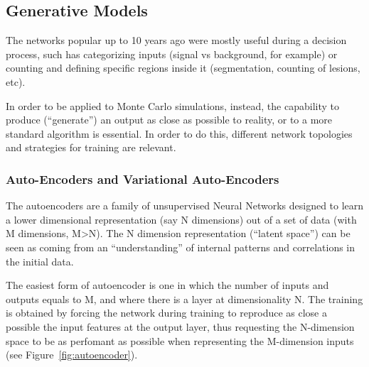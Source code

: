 \subsection{Generative Models}
\label{subseq:gan}
The networks popular up to 10 years ago were mostly useful during a decision process, such has categorizing inputs (signal vs background, for example) or counting and defining specific regions inside it (segmentation, counting of lesions, etc).

In order to be applied to Monte Carlo simulations, instead, the capability to produce (``generate'') an output as close as possible to reality, or to a more standard algorithm is essential. In order to do this, different network topologies and strategies for training are relevant.


\subsubsection{Auto-Encoders and Variational Auto-Encoders}
\label{sec:unsupervised}
The autoencoders are a family of unsupervised Neural Networks designed to learn a lower dimensional representation (say N dimensions) out of a set of data (with M dimensions, M\textgreater N). The N dimension representation (``latent space'') can be seen as coming from an ``understanding'' of internal patterns and correlations in the initial data.

The easiest form of autoencoder is one in which the number of inputs and outputs equals to M, and where there is a layer at dimensionality N. The training is obtained by forcing the network during training to reproduce as close a possible the input features at the output layer, thus requesting the N-dimension space to be as perfomant as possible when representing the M-dimension inputs (see Figure~\ref{fig:autoencoder}).

